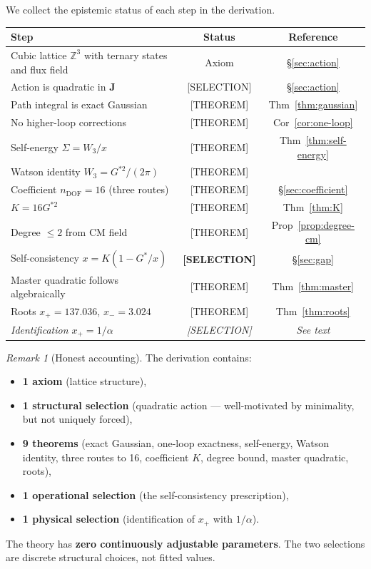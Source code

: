 \documentclass[12pt]{article}
\theoremstyle{definition}
\theoremstyle{remark}
\newtheorem{remark}[theorem]{Remark}
\begin{document}
We collect the epistemic status of each step in the derivation.

\begin{center}
\renewcommand{\arraystretch}{1.3}
\begin{tabular}{@{}p{7cm}cc@{}}
\toprule
\textbf{Step} & \textbf{Status} & \textbf{Reference} \\
\midrule
Cubic lattice $\mathbb{Z}^3$ with ternary states and flux field & Axiom & \S\ref{sec:action} \\
Action is quadratic in $\mathbf{J}$ & [SELECTION] & \S\ref{sec:action} \\
Path integral is exact Gaussian & [THEOREM] & Thm~\ref{thm:gaussian} \\
No higher-loop corrections & [THEOREM] & Cor~\ref{cor:one-loop} \\
Self-energy $\Sigma = W_3/x$ & [THEOREM] & Thm~\ref{thm:self-energy} \\
Watson identity $W_3 = G^{*2}/(2\pi)$ & [THEOREM] & \cite{watson1939} \\
Coefficient $n_\mathrm{DOF} = 16$ (three routes) & [THEOREM] & \S\ref{sec:coefficient} \\
$K = 16G^{*2}$ & [THEOREM] & Thm~\ref{thm:K} \\
Degree $\leq 2$ from CM field & [THEOREM] & Prop~\ref{prop:degree-cm} \\
Self-consistency $x = K(1 - G^*/x)$ & \textbf{[SELECTION]} & \S\ref{sec:gap} \\
Master quadratic follows algebraically & [THEOREM] & Thm~\ref{thm:master} \\
Roots $x_+ = 137.036$, $x_- = 3.024$ & [THEOREM] & Thm~\ref{thm:roots} \\
\textit{Identification $x_+ = 1/\alpha$} & \textit{[SELECTION]} & \textit{See text} \\
\bottomrule
\end{tabular}
\end{center}

\begin{remark}[Honest accounting]
The derivation contains:
\begin{itemize}[nosep]
    \item \textbf{1 axiom} (lattice structure),
    \item \textbf{1 structural selection} (quadratic action --- well-motivated by minimality, but not uniquely forced),
    \item \textbf{9 theorems} (exact Gaussian, one-loop exactness, self-energy, Watson identity, three routes to 16, coefficient $K$, degree bound, master quadratic, roots),
    \item \textbf{1 operational selection} (the self-consistency prescription),
    \item \textbf{1 physical selection} (identification of $x_+$ with $1/\alpha$).
\end{itemize}
The theory has \textbf{zero continuously adjustable parameters}. The two selections are discrete structural choices, not fitted values.
\end{remark}
\end{document}

